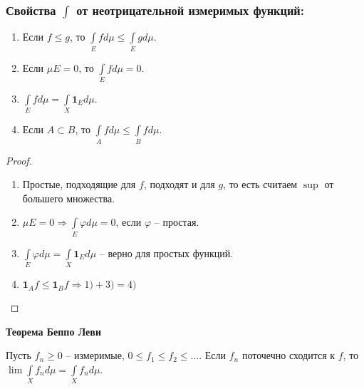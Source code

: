\subsubsection*{Свойства $\int$ от неотрицательной измеримых функций:}

\begin{enumerate}
    \item Если $f\leq g$, то $\int\limits_E fd\mu \leq \int\limits_E gd\mu$.
    
    \item Если $\mu E=0$, то $\int\limits_E fd\mu=0$.
    
    \item $\int\limits_E fd\mu =\int\limits_X \mathbf{1}_E d\mu$.
    
    \item Если $A\subset B$, то $\int\limits_A fd\mu\leq \int\limits_B fd\mu$.
\end{enumerate}

\begin{proof}~
    \begin{enumerate}
        \item Простые, подходящие для $f$, подходят и для $g$, то есть считаем $\sup$ от большего множества.
        \item $\mu E=0\Rightarrow \int\limits_E \varphi d\mu=0$, если $\varphi$ – простая.
        \item $\int\limits_E \varphi d\mu=\int\limits_X \mathbf{1}_E d\mu$ – верно для простых функций.
        \item $\mathbf{1}_A f\leq \mathbf{1}_B f\Rightarrow 1) + 3) = 4)$
    \end{enumerate}
\end{proof}

\begin{theorem}
    \textbf{Теорема Беппо Леви}

    Пусть $f_n\geq 0$ – измеримые, $0\leq f_1 \leq f_2 \leq ...$. 
    Если $f_n$ поточечно сходится к $f$, то $\lim \int\limits_X f_n d\mu =\int\limits_X f_n d\mu$.
\end{theorem}

